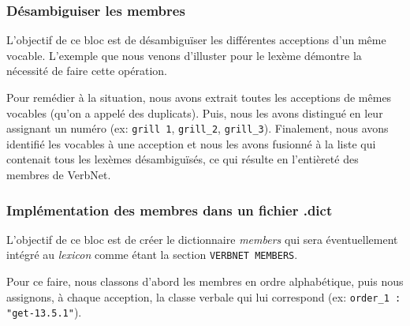 \subsubsection{Désambiguiser les membres}

L'objectif de ce bloc est de désambiguïser les différentes acceptions d'un même vocable. L'exemple que nous venons d'illuster pour le lexème  démontre la nécessité de faire cette opération.

Pour remédier à la situation, nous avons extrait toutes les acceptions de mêmes vocables (qu'on a appelé des duplicats). Puis, nous les avons distingué en leur assignant un numéro (ex: \texttt{grill 1}, \texttt{grill\_2}, \texttt{grill\_3}). Finalement, nous avons identifié les vocables à une acception et nous les avons fusionné à la liste qui contenait tous les lexèmes désambiguïsés, ce qui résulte en l'entièreté des membres de VerbNet.

\subsubsection{Implémentation des membres dans un fichier .dict}

L'objectif de ce bloc est de créer le dictionnaire \emph{members} qui sera éventuellement intégré au \emph{lexicon} comme étant la section \texttt{VERBNET MEMBERS}.

Pour ce faire, nous classons d'abord les membres en ordre alphabétique, puis nous assignons, à chaque acception, la classe verbale qui lui correspond (ex: \lstinline|order_1 : "get-13.5.1"|).

